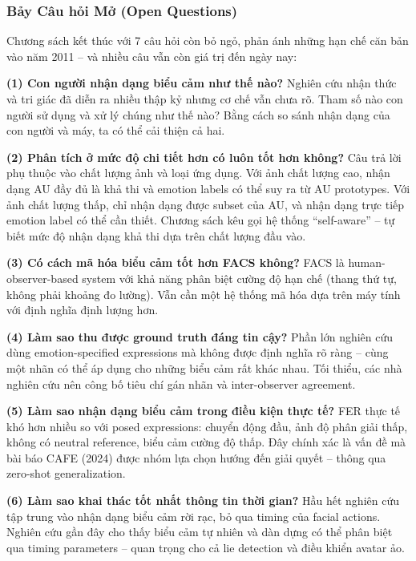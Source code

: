 \documentclass[12pt,a4paper]{article}
\let\oldtextbf\textbf
\renewcommand{\textbf}[1]{\oldtextbf{\textcolor{hcmublue}{#1}}}
\begin{document}
\subsubsection{Bảy Câu hỏi Mở (Open Questions)}

Chương sách kết thúc với 7 câu hỏi còn bỏ ngỏ, phản ánh những hạn chế căn bản vào năm 2011 -- và nhiều câu vẫn còn giá trị đến ngày nay:

\textbf{(1) Con người nhận dạng biểu cảm như thế nào?}
Nghiên cứu nhận thức và tri giác đã diễn ra nhiều thập kỷ nhưng cơ chế vẫn chưa rõ. Tham số nào con người sử dụng và xử lý chúng như thế nào? Bằng cách so sánh nhận dạng của con người và máy, ta có thể cải thiện cả hai.

\textbf{(2) Phân tích ở mức độ chi tiết hơn có luôn tốt hơn không?}
Câu trả lời phụ thuộc vào chất lượng ảnh và loại ứng dụng. Với ảnh chất lượng cao, nhận dạng AU đầy đủ là khả thi và emotion labels có thể suy ra từ AU prototypes. Với ảnh chất lượng thấp, chỉ nhận dạng được subset của AU, và nhận dạng trực tiếp emotion label có thể cần thiết. Chương sách kêu gọi hệ thống ``self-aware'' -- tự biết mức độ nhận dạng khả thi dựa trên chất lượng đầu vào.

\textbf{(3) Có cách mã hóa biểu cảm tốt hơn FACS không?}
FACS là human-observer-based system với khả năng phân biệt cường độ hạn chế (thang thứ tự, không phải khoảng đo lường). Vẫn cần một hệ thống mã hóa dựa trên máy tính với định nghĩa định lượng hơn.

\textbf{(4) Làm sao thu được ground truth đáng tin cậy?}
Phần lớn nghiên cứu dùng emotion-specified expressions mà không được định nghĩa rõ ràng -- cùng một nhãn có thể áp dụng cho những biểu cảm rất khác nhau. Tối thiểu, các nhà nghiên cứu nên công bố tiêu chí gán nhãn và inter-observer agreement.

\textbf{(5) Làm sao nhận dạng biểu cảm trong điều kiện thực tế?}
FER thực tế khó hơn nhiều so với posed expressions: chuyển động đầu, ảnh độ phân giải thấp, không có neutral reference, biểu cảm cường độ thấp. Đây chính xác là vấn đề mà bài báo CAFE (2024) được nhóm lựa chọn hướng đến giải quyết -- thông qua zero-shot generalization.

\textbf{(6) Làm sao khai thác tốt nhất thông tin thời gian?}
Hầu hết nghiên cứu tập trung vào nhận dạng biểu cảm rời rạc, bỏ qua timing của facial actions. Nghiên cứu gần đây cho thấy biểu cảm tự nhiên và dàn dựng có thể phân biệt qua timing parameters -- quan trọng cho cả lie detection và điều khiển avatar ảo.
\end{document}
